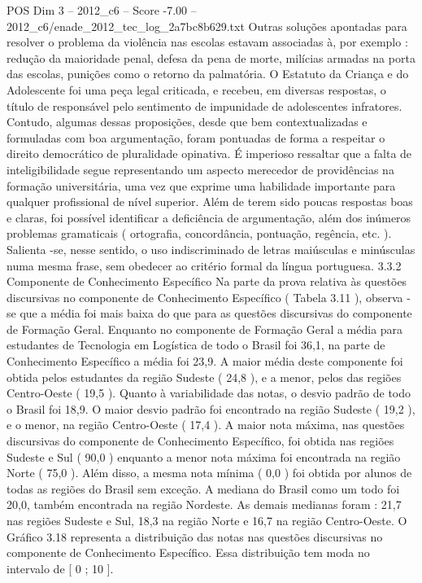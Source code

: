 \begin{textsample}{POS Dim 3 – 2012\_c6 – Score -7.00 – 2012\_c6/enade\_2012\_tec\_log\_2a7bc8b629.txt}
Outras soluções apontadas para resolver o problema da violência nas escolas estavam associadas à, por exemplo : redução da maioridade penal, defesa da pena de morte, milícias armadas na porta das escolas, punições como o retorno da palmatória.
O Estatuto da Criança e do Adolescente foi uma peça legal criticada, e recebeu, em diversas respostas, o título de responsável pelo sentimento de impunidade de adolescentes infratores.
Contudo, algumas dessas proposições, desde que bem contextualizadas e formuladas com boa argumentação, foram pontuadas de forma a respeitar o direito democrático de pluralidade opinativa.
É imperioso ressaltar que a falta de inteligibilidade segue representando um aspecto merecedor de providências na formação universitária, uma vez que exprime uma habilidade importante para qualquer profissional de nível superior.
Além de terem sido poucas respostas boas e claras, foi possível identificar a deficiência de argumentação, além dos inúmeros problemas gramaticais ( ortografia, concordância, pontuação, regência, etc. ).
Salienta -se, nesse sentido, o uso indiscriminado de letras maiúsculas e minúsculas numa mesma frase, sem obedecer ao critério formal da língua portuguesa. 3.3.2 Componente de Conhecimento Específico Na parte da prova relativa às questões discursivas no componente de Conhecimento Específico ( Tabela 3.11 ), observa -se que a média foi mais baixa do que para as questões discursivas do componente de Formação Geral.
Enquanto no componente de Formação Geral a média para estudantes de Tecnologia em Logística de todo o Brasil foi 36,1, na parte de Conhecimento Específico a média foi 23,9.
A maior média deste componente foi obtida pelos estudantes da região Sudeste ( 24,8 ), e a menor, pelos das regiões Centro-Oeste ( 19,5 ).
Quanto à variabilidade das notas, o desvio padrão de todo o Brasil foi 18,9.
O maior desvio padrão foi encontrado na região Sudeste ( 19,2 ), e o menor, na região Centro-Oeste ( 17,4 ).
A maior nota máxima, nas questões discursivas do componente de Conhecimento Específico, foi obtida nas regiões Sudeste e Sul ( 90,0 ) enquanto a menor nota máxima foi encontrada na região Norte ( 75,0 ).
Além disso, a mesma nota mínima ( 0,0 ) foi obtida por alunos de todas as regiões do Brasil sem exceção.
A mediana do Brasil como um todo foi 20,0, também encontrada na região Nordeste.
As demais medianas foram : 21,7 nas regiões Sudeste e Sul, 18,3 na região Norte e 16,7 na região Centro-Oeste.
O Gráfico 3.18 representa a distribuição das notas nas questões discursivas no componente de Conhecimento Específico.
Essa distribuição tem moda no intervalo de [ 0 ; 10 ].

\end{textsample}
